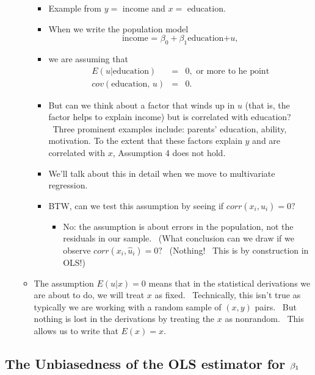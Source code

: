 \documentclass[11pt]{article}
\begin{document}
\begin{itemize}
\begin{itemize}
\begin{itemize}
\item Example from $y=$ income and $x=$ education.

\item When we write the population model%
\begin{equation*}
\text{income = }\beta _{0}+\beta _{1}\text{education+}u,
\end{equation*}

\item we are assuming that 
\begin{eqnarray*}
E(u|\text{education}) &=&0,\text{ or more to he point} \\
cov\left( \text{education, }u\right) &=&0.
\end{eqnarray*}

\item But can we think about a factor that winds up in $u$ (that is, the
factor helps to explain income) but is correlated with education? \ Three
prominent examples include: parents' education, ability, motivation. To the
extent that these factors explain $y$ and are correlated with $x$,
Assumption 4 does not hold.

\item We'll talk about this in detail when we move to multivariate
regression. \ \ 

\item BTW, can we test this assumption by seeing if $corr(x_{i},\widehat{u}%
_{i})=0?$ \ 

\begin{itemize}
\item No: the assumption is about errors in the population, not the
residuals in our sample. \ (What conclusion can we draw if we observe $%
corr(x_{i},\widehat{u}_{i})=0?$ \ (Nothing! \ This is by construction in
OLS!)
\end{itemize}
\end{itemize}

\item The assumption $E(u|x)=0$ means that in the statistical derivations we
are about to do, we will treat $x$ as fixed. \ Technically, this isn't true
as typically we are working with a random sample of $\left( x,y\right) $
pairs. \ But nothing is lost in the derivations by treating the $x$ as
nonrandom. \ This allows us to write that $E(x)=x.$
\end{itemize}
\end{itemize}

\subsection{The Unbiasedness of the OLS estimator for $\protect\beta _{1}$}
\end{document}
